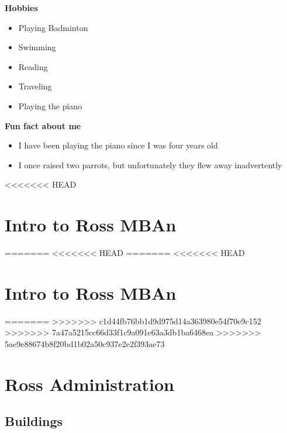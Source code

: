 \documentclass[
]{book}
\begin{document}
\textbf{Hobbies}

\begin{itemize}
\item
  Playing Badminton
\item
  Swimming
\item
  Reading
\item
  Traveling
\item
  Playing the piano
\end{itemize}

\textbf{Fun fact about me}

\begin{itemize}
\item
  I have been playing the piano since I was four years old
\item
  I once raised two parrots, but unfortunately they flew away inadvertently
\end{itemize}

<<<<<<< HEAD
\hypertarget{intro-to-ross-mban}{%
\chapter{Intro to Ross MBAn}\label{intro-to-ross-mban}}

=======
<<<<<<< HEAD
=======
<<<<<<< HEAD
\hypertarget{intro-to-ross-mban}{%
\chapter{Intro to Ross MBAn}\label{intro-to-ross-mban}}

=======
>>>>>>> c1d44fb76bb1d9d975d14a363980e54f70e9c152
>>>>>>> 7a47a5215cc66d33f1c9a091e63a3db1ba6468ea
>>>>>>> 5ae9e88674b8f20bd1b02a50c937e2e2f393ae73
\hypertarget{ross-administration}{%
\chapter{Ross Administration}\label{ross-administration}}

\hypertarget{buildings}{%
\section{Buildings}\label{buildings}}
\end{document}
